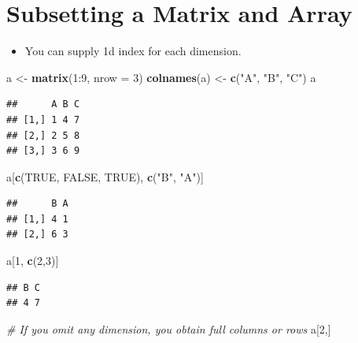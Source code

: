 \documentclass[]{book}
\newenvironment{Shaded}{\begin{snugshade}}{\end{snugshade}}
\newcommand{\KeywordTok}[1]{\textcolor[rgb]{0.13,0.29,0.53}{\textbf{{#1}}}}
\newcommand{\DataTypeTok}[1]{\textcolor[rgb]{0.13,0.29,0.53}{{#1}}}
\newcommand{\DecValTok}[1]{\textcolor[rgb]{0.00,0.00,0.81}{{#1}}}
\newcommand{\StringTok}[1]{\textcolor[rgb]{0.31,0.60,0.02}{{#1}}}
\newcommand{\CommentTok}[1]{\textcolor[rgb]{0.56,0.35,0.01}{\textit{{#1}}}}
\newcommand{\OtherTok}[1]{\textcolor[rgb]{0.56,0.35,0.01}{{#1}}}
\newcommand{\NormalTok}[1]{{#1}}
\providecommand{\tightlist}{%
  \setlength{\itemsep}{0pt}\setlength{\parskip}{0pt}}
\begin{document}
\section{Subsetting a Matrix and
Array}\label{subsetting-a-matrix-and-array}

\begin{itemize}
\tightlist
\item
  You can supply 1d index for each dimension.
\end{itemize}

\begin{Shaded}
\begin{Highlighting}[]
\NormalTok{a <-}\StringTok{ }\KeywordTok{matrix}\NormalTok{(}\DecValTok{1}\NormalTok{:}\DecValTok{9}\NormalTok{, }\DataTypeTok{nrow =} \DecValTok{3}\NormalTok{)}
\KeywordTok{colnames}\NormalTok{(a) <-}\StringTok{ }\KeywordTok{c}\NormalTok{(}\StringTok{"A"}\NormalTok{, }\StringTok{"B"}\NormalTok{, }\StringTok{"C"}\NormalTok{)}
\NormalTok{a}
\end{Highlighting}
\end{Shaded}

\begin{verbatim}
##      A B C
## [1,] 1 4 7
## [2,] 2 5 8
## [3,] 3 6 9
\end{verbatim}

\begin{Shaded}
\begin{Highlighting}[]
\NormalTok{a[}\KeywordTok{c}\NormalTok{(}\OtherTok{TRUE}\NormalTok{, }\OtherTok{FALSE}\NormalTok{, }\OtherTok{TRUE}\NormalTok{), }\KeywordTok{c}\NormalTok{(}\StringTok{"B"}\NormalTok{, }\StringTok{"A"}\NormalTok{)]}
\end{Highlighting}
\end{Shaded}

\begin{verbatim}
##      B A
## [1,] 4 1
## [2,] 6 3
\end{verbatim}

\begin{Shaded}
\begin{Highlighting}[]
\NormalTok{a[}\DecValTok{1}\NormalTok{, }\KeywordTok{c}\NormalTok{(}\DecValTok{2}\NormalTok{,}\DecValTok{3}\NormalTok{)]}
\end{Highlighting}
\end{Shaded}

\begin{verbatim}
## B C 
## 4 7
\end{verbatim}

\begin{Shaded}
\begin{Highlighting}[]
\CommentTok{# If you omit any dimension, you obtain full columns or rows}
\NormalTok{a[}\DecValTok{2}\NormalTok{,]}
\end{Highlighting}
\end{Shaded}
\end{document}
